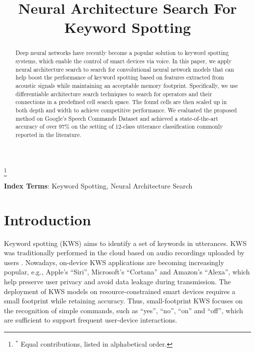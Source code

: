 \documentclass[a4paper]{article}
\title{Neural Architecture Search For Keyword Spotting}
\begin{document}
\maketitle
\renewcommand{\thefootnote}{\fnsymbol{footnote}}
\setcounter{footnote}{-1}
\footnote{$^*$ Equal contributions, listed in alphabetical order.}
\begin{abstract}
   Deep neural networks have recently become a popular solution to keyword spotting systems, which enable the control of smart devices via voice. In this paper, we apply neural architecture search to search for convolutional neural network models that can help boost the performance of keyword spotting based on features extracted from acoustic signals while maintaining an acceptable memory footprint. Specifically, we use differentiable architecture search techniques to search for operators and their connections in a predefined cell search space. The found cells are then scaled up in both depth and width to achieve competitive performance. We evaluated the proposed method on Google's Speech Commands Dataset and achieved a state-of-the-art accuracy of over 97\% on the setting of 12-class utterance classification commonly reported in the literature. 
 
\end{abstract}
\noindent\textbf{Index Terms}: Keyword Spotting, Neural Architecture Search

\section{Introduction}

Keyword spotting (KWS) aims to identify a set of keywords in utterances.
KWS was traditionally performed in the cloud based on audio recordings uploaded by users \cite{tang2018deep}.
Nowadays, on-device KWS applications are becoming increasingly popular,  e.g., Apple's ``Siri'', Microsoft's ``Cortana'' and Amazon's ``Alexa'', which help preserve user privacy and avoid data leakage during transmission. 
The deployment of KWS models on resource-constrained smart devices requires a small footprint while retaining accuracy. 
Thus, small-footprint KWS focuses on the recognition of simple commands, such as ``yes'', ``no'', ``on'' and ``off'', which are sufficient to support frequent user-device interactions.
\end{document}
